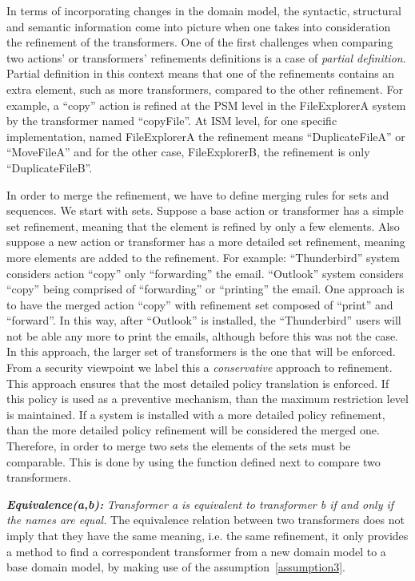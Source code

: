 \documentclass{sig-alternate}
\begin{document}
In terms of incorporating changes in the domain model,
the syntactic, structural and semantic information come into picture when one takes into consideration the refinement of the transformers.
One of the first challenges when comparing two actions' or transformers' refinements definitions is a case of \textit{partial definition}.
Partial definition in this context means that one of the refinements contains an extra element, such as more transformers, compared to the other refinement.
For example, a ``copy'' action is refined at the PSM level in the FileExplorerA system by the transformer named ``copyFile''.
At ISM level, for one specific implementation, named FileExplorerA the refinement means ``DuplicateFileA'' or ``MoveFileA'' 
and for the other case, FileExplorerB, the refinement is only ``DuplicateFileB''.

In order to merge the refinement, we have to define merging rules for sets and sequences. We start with sets.
Suppose a base action or transformer has a simple set refinement, meaning that the element is refined by only a few elements.
Also suppose a new action or transformer has a more detailed set refinement, meaning more elements are added to the refinement.
For example: ``Thunderbird'' system considers action ``copy'' only ``forwarding'' the email. 
``Outlook'' system considers ``copy'' being comprised of ``forwarding'' or ``printing'' the email. 
One approach is to have the merged action ``copy'' with refinement set composed of ``print'' and ``forward''.
In this way, after ``Outlook'' is installed, the ``Thunderbird'' users will not be able any more to print the emails,
although before this was not the case.
In this approach, the larger set of transformers is the one that will be enforced. 
From a security viewpoint we label this a \textit{conservative} approach to refinement. 
This approach ensures that the most detailed policy translation is enforced.
If this policy is used as a preventive mechanism, than the maximum restriction level is maintained. 
If a system is installed with a more detailed policy refinement, than the more detailed policy refinement will be considered the merged one.
Therefore, in order to merge two sets the elements of the sets must be comparable.
This is done by using the  function defined next to compare two transformers.

\textbf{\textit{Equivalence(a,b):}} \textit{Transformer a is equivalent to transformer b if and only if the names are equal.}
The equivalence relation between two transformers does not imply that they have the same meaning, i.e. the same refinement,
it only provides a method to find a correspondent transformer from a new domain model to a base domain model,
by making use of the assumption~\ref{assumption3}.
\end{document}
